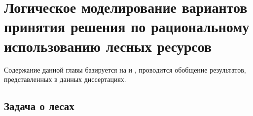 \chapter{Логическое моделирование вариантов принятия решения по рациональному использованию лесных ресурсов}

Содержание данной главы базируется на \cite{dissche} и \cite{dissAsya}, проводится обобщение результатов, представленных в данных диссертациях.

\section{Задача о лесах}

